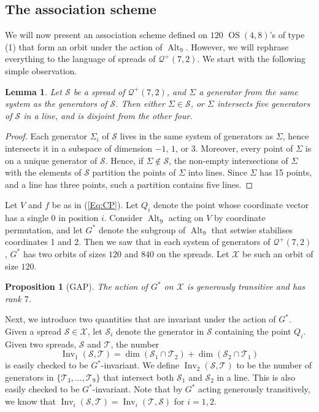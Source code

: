 \documentclass[a4paper]{article}
\newtheorem{lm}[thm]{Lemma}
\newtheorem{prop}[thm]{Proposition}
\theoremstyle{definition}
\newcommand{\mq}{\mathcal Q}
\newcommand{\ms}{\mathcal S}
\newcommand{\mt}{\mathcal T}
\newcommand{\mx}{\mathcal X}
\DeclareMathOperator{\OS}{OS}
\DeclareMathOperator{\Alt}{Alt}
\DeclareMathOperator{\Inv}{Inv}
\begin{document}
\subsection{The association scheme}
 \label{Sec:Assoc:Spreads}

We will now present an association scheme defined on $120$ $\OS(4,8)$'s of type (1) that form an orbit under the action of $\Alt_9$.
However, we will rephrase everything to the language of spreads of $\mq^+(7,2)$.
We start with the following simple observation.

\begin{lm}
 Let $\ms$ be a spread of $\mq^+(7,2)$, and $\Sigma$ a generator from the same system as the generators of $\ms$.
 Then either $\Sigma \in \ms$, or $\Sigma$ intersects five generators of $\ms$ in a line, and is disjoint from the other four.
\end{lm}

\begin{proof}
 Each generator $\Sigma_i$ of $\ms$ lives in the same system of generators as $\Sigma$, hence intersects it in a subspace of dimension $-1$, $1$, or $3$.
 Moreover, every point of $\Sigma$ is on a unique generator of $\ms$.
 Hence, if $\Sigma \notin \ms$, the non-empty intersections of $\Sigma$ with the elements of $\ms$ partition the points of $\Sigma$ into lines.
 Since $\Sigma$ has 15 points, and a line has three points, such a partition contains five lines.
\end{proof}

Let $V$ and $f$ be as in (\ref{Eq:CP}).
Let $Q_i$ denote the point whose coordinate vector has a single 0 in position $i$.
Consider $\Alt_9$ acting on $V$ by coordinate permutation, and let $G^*$ denote the subgroup of $\Alt_9$ that setwise stabilises coordinates 1 and 2.
Then we saw that in each system of generators of $\mq^+(7,2)$, $G^*$ has two orbits of sizes $120$ and $840$ on the spreads.
Let $\mx$ be such an orbit of size $120$.

\begin{prop}[GAP]
 \label{Prop:Gen Trans}
 The action of $G^*$ on $\mx$ is generously transitive and has rank $7$.
\end{prop}

Next, we introduce two quantities that are invariant under the action of $G^*$.
Given a spread $\ms \in \mx$, let $\ms_i$ denote the generator in $\ms$ containing the point $Q_i$.
Given two spreads, $\ms$ and $\mt$, the number
\[
 \Inv_1(\ms,\mt) = \dim(\ms_1 \cap \mt_2) + \dim(\ms_2 \cap \mt_1)
\]
is easily checked to be $G^*$-invariant.
We define $\Inv_2(\ms,\mt)$ to be the number of generators in $\{\mt_3, \dots, \mt_9\}$ that intersect both $\ms_1$ and $\ms_2$ in a line.
This is also easily checked to be $G^*$-invariant.
Note that by $G^*$ acting generously transitively, we know that $\Inv_i(\ms,\mt) = \Inv_i(\mt,\ms)$ for $i = 1,2$.
\end{document}
